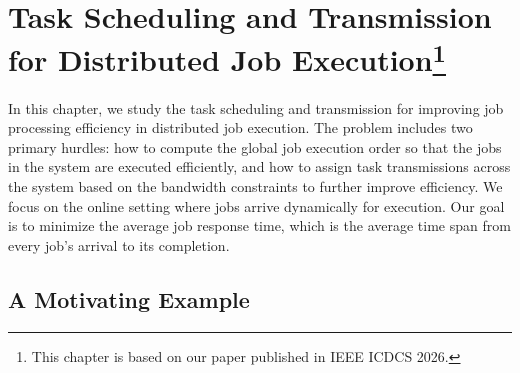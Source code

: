 \chapter{Task Scheduling and Transmission for Distributed Job Execution\protect\footnote{This chapter is based on our paper published in IEEE ICDCS 2026.}}
\label{ch:WAST}
In this chapter, we study the task scheduling and transmission for improving job processing efficiency in distributed job execution. The problem includes two primary hurdles: how to compute the global job execution order so that the jobs in the system are executed efficiently, and how to assign task transmissions across the system based on the bandwidth constraints to further improve efficiency. We focus on the online setting where jobs arrive dynamically for execution. Our goal is to minimize the average job response time, which is the average time span from every job's arrival to its completion. %

\section{A Motivating Example}
\label{sec:example}


